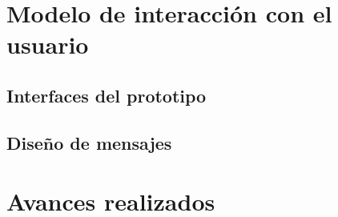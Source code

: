 \documentclass[10pt]{book}
\begin{document}
    

\chapter{Modelo de interacción con el usuario}\label{chp:modeloInteraccionUsuario}

\section{Interfaces del prototipo}
      
\section{Diseño de mensajes}

\chapter{Avances realizados}\label{chp:avances}


\end{document}
